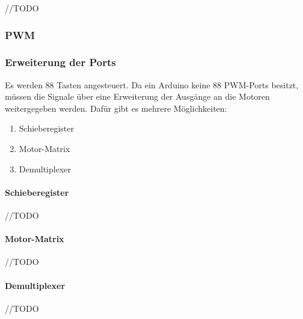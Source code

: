 //TODO

\newline \subsubsection{PWM}
\newline \subsubsection{Erweiterung der Ports}
Es werden 88 Tasten angesteuert. Da ein Arduino keine 88 PWM-Ports besitzt, müssen die Signale über
eine Erweiterung der Ausgänge an die Motoren weitergegeben werden. Dafür gibt es mehrere Möglichkeiten:
\newline
\begin{enumerate}
	\item Schieberegister
	\item Motor-Matrix
	\item Demultiplexer
\end{enumerate}

\newline \paragraph{Schieberegister}
//TODO
\paragraph{Motor-Matrix}
//TODO
\paragraph{Demultiplexer}
//TODO

